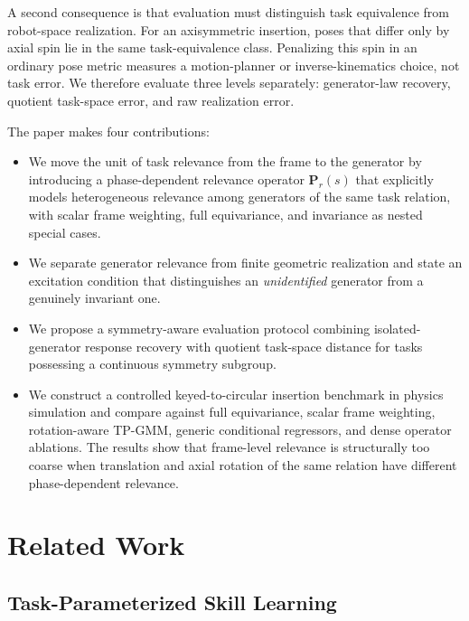 \documentclass[letterpaper,10pt,conference]{ieeeconf}
\begin{document}
A second consequence is that evaluation must distinguish task equivalence from
robot-space realization. For an axisymmetric insertion, poses that differ only
by axial spin lie in the same task-equivalence class. Penalizing this spin in an
ordinary pose metric measures a motion-planner or inverse-kinematics choice,
not task error. We therefore evaluate three levels separately: generator-law
recovery, quotient task-space error, and raw realization error.

The paper makes four contributions:
\begin{itemize}[leftmargin=*,itemsep=1pt,topsep=2pt]
    \item We move the unit of task relevance from the frame to the generator by
    introducing a phase-dependent relevance operator
    $\mathbf P_r(s)$ that explicitly models heterogeneous relevance among
    generators of the same task relation, with scalar frame weighting, full
    equivariance, and invariance as nested special cases.
    \item We separate generator relevance from finite geometric realization and
    state an excitation condition that distinguishes an \emph{unidentified}
    generator from a genuinely invariant one.
    \item We propose a symmetry-aware evaluation protocol combining
    isolated-generator response recovery with quotient task-space distance for
    tasks possessing a continuous symmetry subgroup.
    \item We construct a controlled keyed-to-circular insertion benchmark in
    physics simulation and compare against full equivariance, scalar
    frame weighting, rotation-aware TP-GMM, generic conditional regressors, and
    dense operator ablations. The results show that frame-level relevance is
    structurally too coarse when translation and axial rotation of the same
    relation have different phase-dependent relevance.
\end{itemize}

\section{Related Work}
\label{sec:related}

\subsection{Task-Parameterized Skill Learning}
\end{document}
